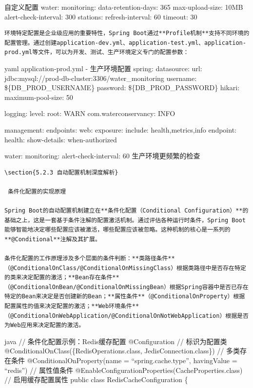  自定义配置 water: monitoring: data-retention-days: 365 max-upload-size: 10MB alert-check-interval: 300 stations: refresh-interval: 60 timeout: 30

\begin{lstlisting}
环境特定配置是企业级应用的重要特性，Spring Boot通过**Profile机制**支持不同环境的配置管理。通过创建application-dev.yml、application-test.yml、application-prod.yml等文件，可以为开发、测试、生产环境定义专门的配置参数：
\end{lstlisting}

yaml  application-prod.yml - 生产环境配置 spring: datasource: url: jdbc:mysql://prod-db-cluster:3306/water\_monitoring username: \$\{DB\_PROD\_USERNAME\} password: \$\{DB\_PROD\_PASSWORD\} hikari: maximum-pool-size: 50

logging: level: root: WARN com.waterconservancy: INFO

management: endpoints: web: exposure: include: health,metrics,info endpoint: health: show-details: when-authorized

water: monitoring: alert-check-interval: 60  生产环境更频繁的检查

\begin{lstlisting}
\section{5.2.3 自动配置机制深度解析}

 条件化配置的实现原理

Spring Boot的自动配置机制建立在**条件化配置（Conditional Configuration）**的基础之上，这是一套基于条件注解的配置激活机制。通过评估各种运行时条件，Spring Boot能够智能地决定哪些配置应该被激活，哪些配置应该被忽略。这种机制的核心是一系列的**@Conditional**注解及其扩展。

条件化配置的工作原理涉及多个层面的条件判断：**类路径条件**（@ConditionalOnClass/@ConditionalOnMissingClass）根据类路径中是否存在特定的类来决定配置的激活；**Bean存在条件**（@ConditionalOnBean/@ConditionalOnMissingBean）根据Spring容器中是否已存在特定的Bean来决定是否创建新的Bean；**属性条件**（@ConditionalOnProperty）根据配置属性的值来决定配置的激活；**Web环境条件**（@ConditionalOnWebApplication/@ConditionalOnNotWebApplication）根据是否为Web应用来决定配置的激活。
\end{lstlisting}

java // 条件化配置示例：Redis缓存配置 @Configuration // 标识为配置类 @ConditionalOnClass(\{RedisOperations.class, JedisConnection.class\}) // 多类存在条件 @ConditionalOnProperty(name = ``spring.cache.type'', havingValue = ``redis'') // 属性值条件 @EnableConfigurationProperties(CacheProperties.class) // 启用缓存配置属性 public class RedisCacheConfiguration \{

